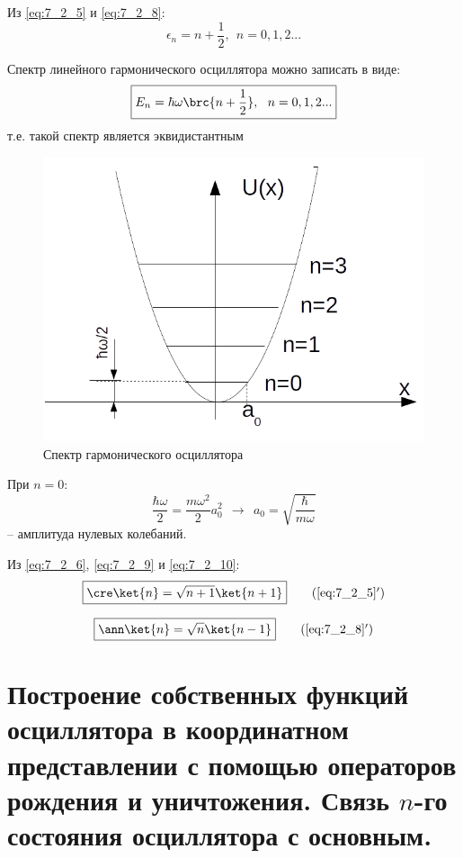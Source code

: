 Из \eqref{eq:7_2_5} и \eqref{eq:7_2_8}: 
\begin{equation}
\label{eq:7_2_10}
\epsilon_n = n + \frac{1}{2},~~ n = 0,1,2...
\end{equation}

Спектр линейного гармонического осциллятора можно записать в виде:
$$
\boxed {
	E_n = \hbar \omega \brc{n + \frac{1}{2}},~~ n = 0,1,2...
}
$$
т.е. такой спектр является эквидистантным

\begin{figure}[h]
  \centering
  \includegraphics[scale=0.6]{figs/7_1}
  \caption{Спектр гармонического осциллятора}
  \label{fig:7_1}
\end{figure}

При $n = 0$:
$$
\frac{\hbar \omega}{2} = \frac{m\omega^2}{2} a_0^2  ~~\to~~ a_0 = \sqrt{\frac{\hbar}{m\omega}}
$$
-- амплитуда нулевых колебаний.

Из \eqref{eq:7_2_6}, \eqref{eq:7_2_9} и \eqref{eq:7_2_10}:
\begin{equation}
\label{eq:7_2_5_add}
\boxed {
	\cre\ket{n} = \sqrt{n+1}\ket{n+1}
}
\tag{\ref{eq:7_2_5}$'$}
\end{equation}

\begin{equation}
\label{eq:7_2_8_add}
\boxed {
	\ann\ket{n} = \sqrt{n}\ket{n-1}
}
\tag{\ref{eq:7_2_8}$'$}
\end{equation}

\section{Построение собственных функций осциллятора в координатном представлении с помощью операторов рождения и уничтожения. Связь $n$-го состояния осциллятора с основным.}

